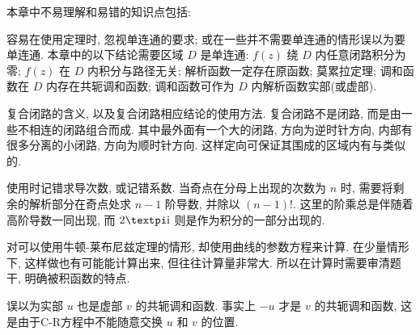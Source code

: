 本章中不易理解和易错的知识点包括:
\begin{enuma}
  \item 容易在使用定理时, 忽视单连通的要求; 或在一些并不需要单连通的情形误以为要单连通.
  本章中的以下结论需要区域 $D$ 是单连通: $f(z)$ 绕 $D$ 内任意闭路积分为零; $f(z)$ 在 $D$ 内积分与路径无关; 解析函数一定存在原函数; 莫累拉定理; 调和函数在 $D$ 内存在共轭调和函数; 调和函数可作为 $D$ 内解析函数实部(或虚部).
  \item 复合闭路的含义, 以及复合闭路相应结论的使用方法.
  复合闭路不是闭路, 而是由一些不相连的闭路组合而成.
  其中最外面有一个大的闭路, 方向为逆时针方向, 内部有很多分离的小闭路, 方向为顺时针方向.
  这样定向可保证其围成的区域内有与\thmCR 类似的\thmCCC.
  \item 使用\thmCIH 时记错求导次数, 或记错系数. 当奇点在分母上出现的次数为 $n$ 时, 需要将剩余的解析部分在奇点处求 $n-1$ 阶导数, 并除以 $(n-1)!$. 这里的阶乘总是伴随着高阶导数一同出现, 而 $2\cpi\ii$ 则是作为积分的一部分出现的.
  \item 对可以使用牛顿-莱布尼兹定理的情形, 却使用曲线的参数方程来计算. 在少量情形下, 这样做也有可能能计算出来, 但往往计算量非常大. 所以在计算时需要审清题干, 明确被积函数的特点.
  \item 误以为实部 $u$ 也是虚部 $v$ 的共轭调和函数. 事实上 $-u$ 才是 $v$ 的共轭调和函数, 这是由于C-R方程中不能随意交换 $u$ 和 $v$ 的位置.
\end{enuma}



